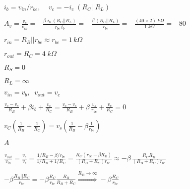 \documentclass{article}
\def\lthtmlcheckvsize{\ifdim\ht\sizebox<\vsize 
  \ifdim\wd\sizebox<\hsize\expandafter\hfill\fi \expandafter\vfill
  \else\expandafter\vss\fi}%
\begin{document}
{\newpage\clearpage
{}%
$\displaystyle i_b=v_{in}/r_{be}, \;\;\;\;v_c=-i_c\; (R_C||R_L)$%
\lthtmlindisplaymathZ
\lthtmlcheckvsize\clearpage}

{\newpage\clearpage
{}%
$\displaystyle A_v=\frac{v_c}{v_{in}}=-\frac{\beta\; i_b\;(R_C||R_L)}{r_{be}\,i_b}
=-\frac{\beta\,(R_C||R_L)}{r_{be}}
=-\frac{(40\times 2)\;k\Omega}{1\;k\Omega}=-80$%
\lthtmlindisplaymathZ
\lthtmlcheckvsize\clearpage}

{\newpage\clearpage
{}%
$ r_{in}=R_B||r_{be}\approx r_{be}=1\,k\Omega$%
\lthtmlindisplaymathZ
\lthtmlcheckvsize\clearpage}

{\newpage\clearpage
{}%
$ r_{out}=R_C=4\;k\Omega$%
\lthtmlindisplaymathZ
\lthtmlcheckvsize\clearpage}

{\newpage\clearpage
{}%
$ R_S=0$%
\lthtmlindisplaymathZ
\lthtmlcheckvsize\clearpage}

{\newpage\clearpage
{}%
$ R_L=\infty$%
\lthtmlindisplaymathZ
\lthtmlcheckvsize\clearpage}

{\newpage\clearpage
{}%
$ v_{in}=v_b,\;\;v_{out}=v_c$%
\lthtmlindisplaymathZ
\lthtmlcheckvsize\clearpage}

{\newpage\clearpage
{}%
$\displaystyle \frac{v_c-v_s}{R_B}+\beta i_b+\frac{v_c}{R_C}
=\frac{v_c-v_s}{R_B}+\beta \,\frac{v_s}{r_{be}}+\frac{v_c}{R_C}=0$%
\lthtmlindisplaymathZ
\lthtmlcheckvsize\clearpage}

{\newpage\clearpage
{}%
$\displaystyle v_C\left(\frac{1}{R_B}+\frac{1}{R_C}\right)
=v_s\left(\frac{1}{R_B}-\beta\frac{1}{r_{be}}\right)$%
\lthtmlindisplaymathZ
\lthtmlcheckvsize\clearpage}

{\newpage\clearpage
{}%
$\displaystyle A$%
\lthtmlindisplaymathZ
\lthtmlcheckvsize\clearpage}

{\newpage\clearpage
{}%
$\displaystyle \frac{v_{out}}{v_{in}}=\frac{v_c}{v_s}
=\frac{1/R_B-\beta/r_{be}}{1/R_B+1/R_C}=\frac{R_C(r_{be}-\beta R_B)}{(R_B+R_C)r_{be}}
\approx-\beta \,\frac{R_C R_B}{(R_B+R_C)r_{be}}$%
\lthtmlindisplaymathZ
\lthtmlcheckvsize\clearpage}

{\newpage\clearpage
{}%
$\displaystyle -\beta \frac{R_B||R_C}{r_{be}}=-\beta\frac{R_C}{r_{be}}\frac{R_B}{R_B+R_C}
\stackrel{R_B\rightarrow\infty}{\Longrightarrow}-\beta\frac{R_C}{r_{be}}$%
\lthtmlindisplaymathZ
\lthtmlcheckvsize\clearpage}
\end{document}
